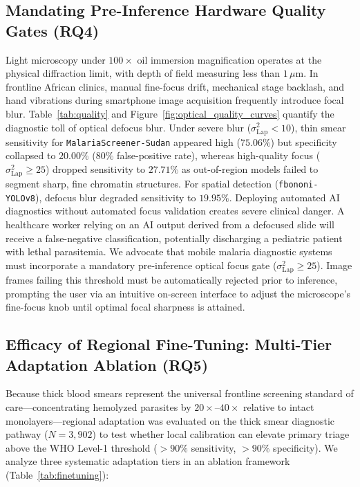 \documentclass[a4paper,11pt]{article}
\begin{document}
\subsection{Mandating Pre-Inference Hardware Quality Gates (RQ4)}
Light microscopy under $100\times$ oil immersion magnification operates at the physical diffraction limit, with depth of field measuring less than $1\,\mu\text{m}$. In frontline African clinics, manual fine-focus drift, mechanical stage backlash, and hand vibrations during smartphone image acquisition frequently introduce focal blur.
Table~\ref{tab:quality} and Figure~\ref{fig:optical_quality_curves} quantify the diagnostic toll of optical defocus blur. Under severe blur ($\sigma^2_{\text{Lap}} < 10$), thin smear sensitivity for \texttt{MalariaScreener-Sudan} appeared high ($75.06\%$) but specificity collapsed to $20.00\%$ ($80\%$ false-positive rate), whereas high-quality focus ($\sigma^2_{\text{Lap}} \ge 25$) dropped sensitivity to $27.71\%$ as out-of-region models failed to segment sharp, fine chromatin structures. For spatial detection (\texttt{fbononi-YOLOv8}), defocus blur degraded sensitivity to $19.95\%$.
Deploying automated AI diagnostics without automated focus validation creates severe clinical danger. A healthcare worker relying on an AI output derived from a defocused slide will receive a false-negative classification, potentially discharging a pediatric patient with lethal parasitemia. We advocate that mobile malaria diagnostic systems must incorporate a mandatory pre-inference optical focus gate ($\sigma^2_{\text{Lap}} \ge 25$). Image frames failing this threshold must be automatically rejected prior to inference, prompting the user via an intuitive on-screen interface to adjust the microscope's fine-focus knob until optimal focal sharpness is attained.

\subsection{Efficacy of Regional Fine-Tuning: Multi-Tier Adaptation Ablation (RQ5)}
Because thick blood smears represent the universal frontline screening standard of care---concentrating hemolyzed parasites by $20\times\text{--}40\times$ relative to intact monolayers---regional adaptation was evaluated on the thick smear diagnostic pathway ($N = 3,902$) to test whether local calibration can elevate primary triage above the WHO Level-1 threshold ($>90\%$ sensitivity, $>90\%$ specificity). We analyze three systematic adaptation tiers in an ablation framework (Table~\ref{tab:finetuning}):
\end{document}
